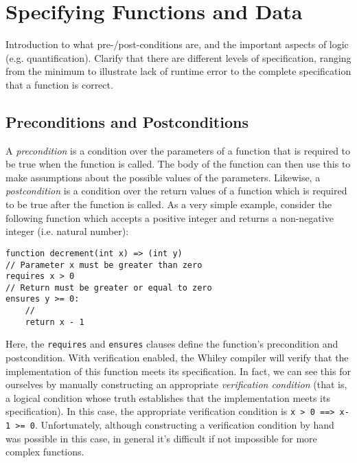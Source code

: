 \chapter{Specifying Functions and Data}
Introduction to what pre-/post-conditions are, and the important aspects of logic (e.g. quantification).  Clarify that there are different levels of specification, ranging from the minimum to illustrate lack of runtime error to the complete specification that a function is correct.

\section{Preconditions and Postconditions}
A {\em precondition} is a condition over the parameters of a function
that is required to be true when the function is called.  The body of
the function can then use this to make assumptions about the possible
values of the parameters.  Likewise, a {\em postcondition} is a
condition over the return values of a function which is required to be
true after the function is called.  As a very simple example, consider
the following function which accepts a positive integer and returns a
non-negative integer (i.e. natural number):
\begin{lstlisting}
function decrement(int x) => (int y) 
// Parameter x must be greater than zero
requires x > 0
// Return must be greater or equal to zero
ensures y >= 0:
    //
    return x - 1
\end{lstlisting}
Here, the \lstinline{requires} and \lstinline{ensures} clauses define
the function's precondition and postcondition.  With verification
enabled, the Whiley compiler will verify that the
implementation of this function meets its specification.  In fact, we
can see this for ourselves by manually constructing an appropriate
{\em verification condition} (that is, a logical condition whose truth
establishes that the implementation meets its specification).  In this
case, the appropriate verification condition is
 \lstinline{x > 0 ==> x-1 >= 0}.  Unfortunately, although constructing a verification
condition by hand was possible in this case, in general it's difficult
if not impossible for more complex functions.

